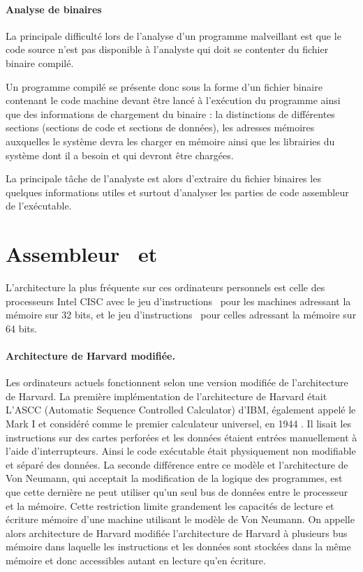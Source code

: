 \paragraph{Analyse de binaires}
La principale difficulté lors de l'analyse d'un programme malveillant est que le code source n'est pas disponible à l'analyste qui doit se contenter du fichier binaire compilé.

Un programme compilé se présente donc sous la forme d'un fichier binaire contenant le code machine devant être lancé à l'exécution du programme ainsi que des informations de chargement du binaire : la distinctions de différentes sections (sections de code et sections de données), les adresses mémoires auxquelles le système devra les charger en mémoire ainsi que les librairies du système dont il a besoin et qui devront être chargées.

La principale tâche de l'analyste est alors d'extraire du fichier binaires les quelques informations utiles et surtout d'analyser les parties de code assembleur de l'exécutable.

\section{Assembleur \xq\ et \xs}
L'architecture la plus fréquente sur ces ordinateurs personnels est celle des processeurs Intel CISC avec le jeu d'instructions \xq\ pour les machines adressant la mémoire sur 32 bits, et le jeu d'instructions \xs\ pour celles adressant la mémoire sur 64 bits.

\paragraph{Architecture de Harvard modifiée.}
Les ordinateurs actuels fonctionnent selon une version modifiée de l'architecture de Harvard.
La première implémentation de l'architecture de Harvard était L’ASCC (Automatic Sequence Controlled Calculator) d'IBM, également appelé le Mark I et considéré comme le premier calculateur universel, en 1944 . Il lisait les instructions sur des cartes perforées et les données étaient entrées manuellement à l'aide d'interrupteurs. Ainsi le code exécutable était physiquement non modifiable et séparé des données. La seconde différence entre ce modèle et l'architecture de Von Neumann, qui acceptait la modification de la logique des programmes, est que cette dernière ne peut utiliser qu'un seul bus de données entre le processeur et la mémoire. Cette restriction limite grandement les capacités de lecture et écriture mémoire d'une machine utilisant le modèle de Von Neumann. On appelle alors architecture de Harvard modifiée l'architecture de Harvard à plusieurs bus mémoire dans laquelle les instructions et les données sont stockées dans la même mémoire et donc accessibles autant en lecture qu'en écriture.

